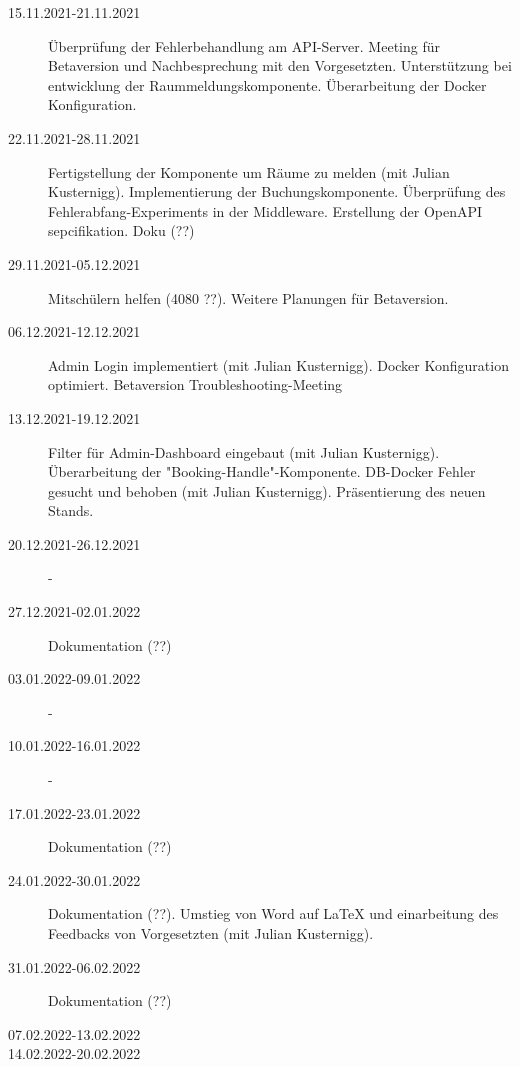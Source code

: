 \begin{description}
    \item[15.11.2021-21.11.2021] Überprüfung der Fehlerbehandlung am API-Server. Meeting für Betaversion und Nachbesprechung mit den Vorgesetzten. Unterstützung bei entwicklung der Raummeldungskomponente. Überarbeitung der Docker Konfiguration.
    \item[22.11.2021-28.11.2021] Fertigstellung der Komponente um Räume zu melden (mit Julian Kusternigg). Implementierung der Buchungskomponente. Überprüfung des Fehlerabfang-Experiments in der Middleware. Erstellung der OpenAPI sepcifikation. Doku (??)
    \item[29.11.2021-05.12.2021] Mitschülern helfen (4080 ??). Weitere Planungen für Betaversion.
    \item[06.12.2021-12.12.2021] Admin Login implementiert (mit Julian Kusternigg). Docker Konfiguration optimiert. Betaversion Troubleshooting-Meeting
    \item[13.12.2021-19.12.2021] Filter für Admin-Dashboard eingebaut (mit Julian Kusternigg). Überarbeitung der "Booking-Handle"-Komponente. DB-Docker Fehler gesucht und behoben (mit Julian Kusternigg). Präsentierung des neuen Stands.
    \item[20.12.2021-26.12.2021] -
    \item[27.12.2021-02.01.2022] Dokumentation (??)
    \item[03.01.2022-09.01.2022] -
    \item[10.01.2022-16.01.2022] -
    \item[17.01.2022-23.01.2022] Dokumentation (??)
    \item[24.01.2022-30.01.2022] Dokumentation (??). Umstieg von Word auf LaTeX und einarbeitung des Feedbacks von Vorgesetzten (mit Julian Kusternigg). 
    \item[31.01.2022-06.02.2022] Dokumentation (??)
    \item[07.02.2022-13.02.2022]
    \item[14.02.2022-20.02.2022] 
\end{description}